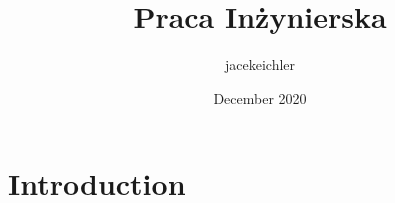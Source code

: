 \documentclass{article}
\title{Praca Inżynierska}
\author{jacekeichler }
\date{December 2020}
\begin{document}
\maketitle

\section{Introduction}
\end{document}
